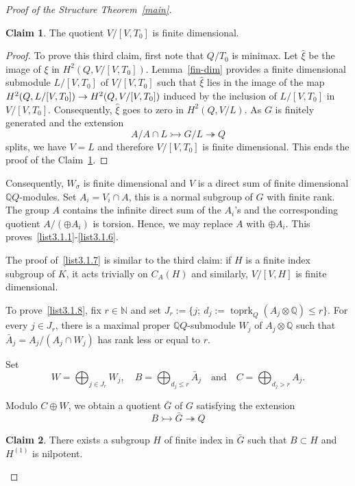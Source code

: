 \documentclass[11pt]{article}
\theoremstyle{definition}
\numberwithin{equation}{section}
\numberwithin{figure}{section}
\numberwithin{table}{section}
\newtheorem{claiml}{Claim}
\newcommand{\Q}{\mathbb{Q}}
\newcommand{\N}{\mathbb{N}}
\newcommand{\mono}{\rightarrowtail}
\newcommand{\epi}{\twoheadrightarrow}
\DeclareMathOperator{\toprk}{toprk}
\begin{document}
\begin{proof}[{Proof of the Structure Theorem~\ref{main}}]
\begin{claiml}\label{claim3}
The quotient $V/[V, T_0]$ is finite dimensional.
\end{claiml}

\begin{proof}
To prove this third claim, first note that $Q/T_0$ is minimax. Let $\hat \xi$ be the image of $\xi$ in $H^2(Q, V/[V, T_0])$. Lemma~\ref{fin-dim} provides a finite dimensional submodule $L/[V, T_0]$ of $V/[V, T_0]$ such that $\hat \xi$ lies in the image of the map $H^2(Q, L/[V, T_0])\linebreak\rightarrow H^2(Q, V/[V, T_0])$ induced by the inclusion of $L/[V, T_0]$ in $V/[V, T_0]$. Consequently, $\hat \xi$ goes to zero in $H^2(Q, V/L)$. As $G$ is finitely generated and the extension
\[
A/A\cap L \mono G/L\epi Q
\]
splits, we have $V = L$ and therefore $V/[V, T_0]$ is finite dimensional. This ends the proof of the Claim~\ref{claim3}.
\end{proof}

Consequently, $W_\sigma$ is finite dimensional and $V$ is a direct sum of finite dimensional $\Q Q$-modules. Set $A_i = V_i \cap A$, this is a normal subgroup of $G$ with finite rank. The group $A$ contains the infinite direct sum of the $A_i$'s and the corresponding quotient $A/(\oplus A_i)$ is torsion. Hence, we may replace $A$ with $\oplus A_i$. This proves~\eqref{list3.1.1}-\eqref{list3.1.6}.


The proof of~\eqref{list3.1.7} is similar to the third claim: if $H$ is a finite index subgroup of $K$, it acts trivially on $C_A(H)$ and similarly, $V/[V, H]$ is finite dimensional.


To prove~\eqref{list3.1.8}, fix $r \in \N$ and set $J_r:=\{j;\ d_j:=\toprk_Q(A_j\otimes\Q) \leq r\}$. For every $j \in J_r$, there is a maximal proper $\Q Q$-submodule $W_j$ of $A_j\otimes
\Q$ such that $\bar A_j = A_j/(A_j \cap W_j)$ has rank less or equal to $r$.

Set
\[
W = \bigoplus_{j\in J_r} W_j,\quad B = \bigoplus_{d_j \leq r} \bar A_j\quad \text{and}\quad C = \bigoplus_{d_j > r} A_j.
\]

Modulo $C\oplus W$, we obtain a quotient $\bar G$ of $G$ satisfying the extension
\[
B \mono \bar G \epi Q
\]
\goodbreak
\begin{claiml}
There exists a subgroup $H$ of finite index in $\bar G$ such that $B \subset H$ and $H^{(1)}$ is nilpotent.
\end{claiml}



\end{proof}
\end{document}
